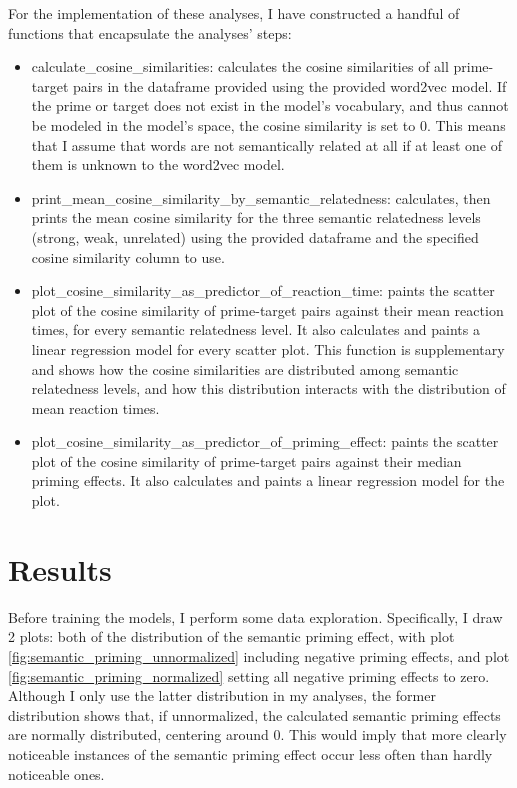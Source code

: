 \documentclass{IEEEtran}
\begin{document}
For the implementation of these analyses, I have constructed a handful of functions that encapsulate the analyses' steps:
\begin{itemize}
    \item calculate\_cosine\_similarities: calculates the cosine similarities of all prime-target pairs in the dataframe provided using the provided word2vec model.
    If the prime or target does not exist in the model's vocabulary, and thus cannot be modeled in the model's space, the cosine similarity is set to 0.
    This means that I assume that words are not semantically related at all if at least one of them is unknown to the word2vec model.
    \item print\_mean\_cosine\_similarity\_by\_semantic\_relatedness: calculates, then prints the mean cosine similarity for the three semantic relatedness levels (strong, weak, unrelated) using the provided dataframe and the specified cosine similarity column to use.
    \item plot\_cosine\_similarity\_as\_predictor\_of\_reaction\_time: paints the scatter plot of the cosine similarity of prime-target pairs against their mean reaction times, for every semantic relatedness level.
    It also calculates and paints a linear regression model for every scatter plot.
    This function is supplementary and shows how the cosine similarities are distributed among semantic relatedness levels, and how this distribution interacts with the distribution of mean reaction times.
    \item plot\_cosine\_similarity\_as\_predictor\_of\_priming\_effect: paints the scatter plot of the cosine similarity of prime-target pairs against their median priming effects.
    It also calculates and paints a linear regression model for the plot.
\end{itemize}

\section{Results}
Before training the models, I perform some data exploration. 
Specifically, I draw 2 plots: both of the distribution of the semantic priming effect, with plot \ref{fig:semantic_priming_unnormalized} including negative priming effects, and plot \ref{fig:semantic_priming_normalized} setting all negative priming effects to zero.
Although I only use the latter distribution in my analyses, the former distribution shows that, if unnormalized, the calculated semantic priming effects are normally distributed, centering around 0.
This would imply that more clearly noticeable instances of the semantic priming effect occur less often than hardly noticeable ones.
\end{document}
